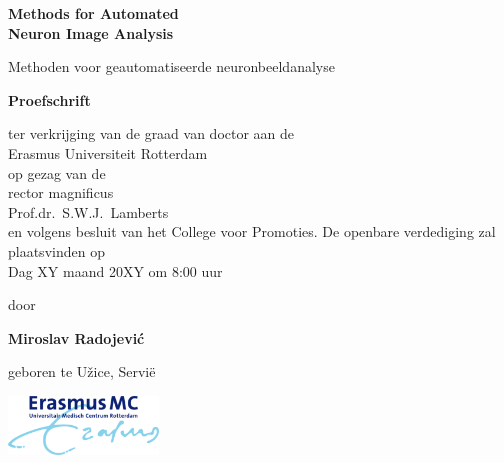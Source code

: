 %
%

\setlength{\parindent}{0pt}
\thispagestyle{empty}

\begin{center}
  
  \vspace*{5mm}
  {\huge\bf Methods for Automated\\[0.3ex] Neuron Image Analysis\\}

  \vfill
  \vfill
  \vfill

  {\large Methoden voor geautomatiseerde neuronbeeldanalyse\\[1ex]}


  \vfill
  \vfill
  \vfill
  \vfill

  {\large\bf Proefschrift}
  {\large 
  \vfill
  \vfill
  
  \normalsize
  
  ter verkrijging van de graad van doctor aan de \\Erasmus Universiteit Rotterdam\\
op gezag van de \\rector magnificus\\
  \vfill
Prof.dr.~S.W.J.~Lamberts\\
  \vfill
en
volgens besluit van het College voor Promoties. 
  \vfill
De openbare verdediging zal plaatsvinden op \\Dag XY maand 20XY om 8:00 uur
  
  
  \vfill
  \vfill
  
  \large
  door}

  \vfill
  \vfill
  \vfill

  {\large\bf Miroslav Radojevi\'{c}}

  \vfill

  {\large geboren te U\v{z}ice, Servi{\"e}}

  \vfill
  \vfill
\includegraphics[width=0.3\textwidth]{./logos/emc}
\end{center}


